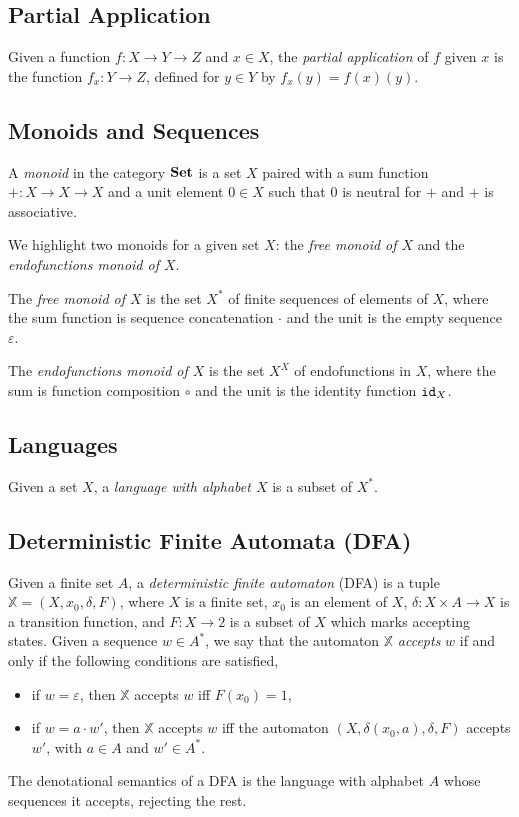 \subsection{Partial Application}
Given a function $f\colon X\rightarrow Y \rightarrow Z$ and $x\in X$, the \emph{partial application} of $f$ given $x$ is the function $f_x\colon Y \rightarrow Z$, defined for $y\in Y$ by $f_x(y)=f(x)(y)$.

\subsection{Monoids and Sequences} 
A \emph{monoid} in the category $\AsCategory{Set}$ is a set $X$ paired with a sum function $+\colon X\rightarrow X\rightarrow X$ and a unit element $0\in X$ such that $0$ is neutral for $+$ and $+$ is associative. 

We highlight two monoids for a given set $X$: the \emph{free monoid of $X$} and the \emph{endofunctions monoid of $X$}.

The \emph{free monoid of $X$} is the set $X^*$ of finite sequences of elements of $X$, where the sum function is sequence concatenation $\cdot$ and the unit is the empty sequence $\varepsilon$.

The \emph{endofunctions monoid of $X$} is the set $X^X$ of endofunctions in $X$, where the sum is function composition $\circ$ and the unit is the identity function ${\texttt{id}}_X$.

\subsection{Languages}
Given a set $X$, a \emph{language with alphabet $X$} is a subset of $X^*$. 

\subsection{Deterministic Finite Automata (DFA)}
Given a finite set $A$, a \emph{deterministic finite automaton} (DFA) is a tuple $\mathbb{X}=(X,x_0,\delta,F)$, where $X$ is a finite set, $x_0$ is an element of $X$, $\delta\colon X\times A \rightarrow X$ is a transition function, and $F\colon X\rightarrow 2$ is a subset of $X$ which marks accepting states. Given a sequence $w\in A^*$, we say that the automaton $\mathbb{X}$ \emph{accepts} $w$ if and only if the following conditions are satisfied,
\begin{itemize}
    \item if $w=\varepsilon$, then $\mathbb{X}$ accepts $w$ iff $F(x_0)=1$, 
    \item if $w=a\cdot w'$, then $\mathbb{X}$ accepts $w$ iff the automaton $(X,\delta(x_0,a),\delta,F)$ accepts $w'$, with $a\in A$ and $w'\in A^*$.
\end{itemize}
The denotational semantics of a DFA is the language with alphabet $A$ whose sequences it accepts, rejecting the rest.

